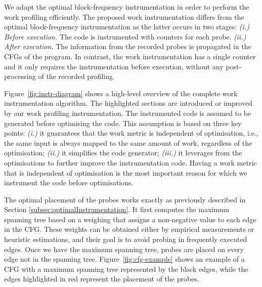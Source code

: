 We adapt the optimal block-frequency instrumentation in order to perform the work profiling efficiently.
The proposed work instrumentation differs from the optimal block-frequency instrumentation as the latter occurs in two stages:
\textit{(i.) Before execution.} The code is instrumented with counters for each probe.
\textit{(ii.) After execution.} The information from the recorded probes is propagated in the CFGs of the program.
In contrast, the work instrumentation has a single counter and it only requires the instrumentation before execution, without any post-processing of the recorded profiling.

Figure~\ref{fig:instr-diagram} shows a high-level overview of the complete work instrumentation algorithm.
The highlighted sections are introduced or improved by our work profiling  instrumentation.
The instrumented code is assumed to be generated before optimising the code.
This assumption is based on three key points:
\textit{(i.)} it guarantees that the work metric is independent of optimisation, i.e., the same input is always mapped to the same amount of work, regardless of the optimisation;
\textit{(ii.)} it simplifies the code generator;
\textit{(iii.)} it leverages from the optimisations to further improve the instrumentation code.
Having a work metric that is independent of optimisation is the most important reason for which we instrument the code before optimisations.

The optimal placement of the probes works exactly as previously described in Section \ref{subsec:optimalInstrumentation}.
It first computes the maximum spanning tree based on a weighing that assigns a non-negative value to each edge in the CFG.
These weights can be obtained either by empirical measurements or heuristic estimations, and their goal is to avoid probing in frequently executed edges.
Once we have the maximum spanning tree, probes are placed on every edge not in the spanning tree.
Figure~\ref{fig:cfg-example} shows an example of a CFG with a maximum spanning tree represented by the black edges, while the edges highlighted in red represent the placement of the probes.

